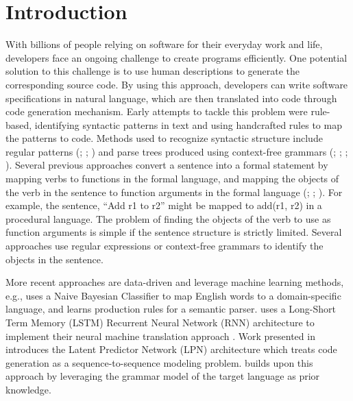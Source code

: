 \documentclass[11pt]{article}
\begin{document}
\section{Introduction}


With billions of people relying on software for their everyday work and life, developers face an ongoing challenge to create programs efficiently.
One potential solution to this challenge is to use human descriptions to generate the corresponding source code. By using this approach, developers can write software specifications in natural language, which are then translated into code through code generation mechanism.
Early attempts to tackle this problem were rule-based, identifying syntactic patterns in text and using handcrafted rules to map the patterns to code. Methods used to recognize
syntactic structure include regular patterns (\citealp[]{conf/sigmod/GulwaniM14}; \citealp[]{conf/aaai/KateWM05}; \citealp[]{Le2013SmartSynthSS}) and parse
trees produced using context-free grammars (\citealp[]{conf/aaai/KateWM05}; \citealp[]{Le2013SmartSynthSS}; \citealp[]{Ballard1979ProgrammingIN}; \citealp[]{Price2000NaturalJavaAN}). Several
previous approaches convert a sentence into a formal statement
by mapping verbs to functions in the formal language, and
mapping the objects of the verb in the sentence to function arguments in the formal language (\citealp[]{Ballard1979ProgrammingIN}; \citealp[]{Price2000NaturalJavaAN}; \citealp[]{Little2006TranslatingKC}). For example, the
sentence, “Add r1 to r2” might be mapped to add(r1, r2) in
a procedural language. The problem of finding the objects of
the verb to use as function arguments is simple if the sentence
structure is strictly limited. Several approaches use regular
expressions \citep{Le2013SmartSynthSS} or context-free grammars \citep{conf/aaai/KateWM05} to identify the
objects in the sentence.





More recent approaches are data-driven and
leverage machine learning methods, e.g., \citep{Desai2016ProgramSU} uses a Naive
Bayesian Classifier to map English words to a domain-specific
language, and \citep{Quirk2015LanguageTC} learns production rules for a semantic
parser. \citep{Rahit2019MachineTF} uses a Long-Short Term Memory
(LSTM) Recurrent Neural Network (RNN) architecture to
implement their neural machine translation approach . Work
presented in \citep{Ling2016LatentPN} introduces the Latent Predictor Network
(LPN) architecture which treats code generation as a sequence-to-sequence modeling problem. \citep{Yin2017ASN} builds upon
this approach by leveraging the grammar model of the target
language as prior knowledge.
\end{document}
